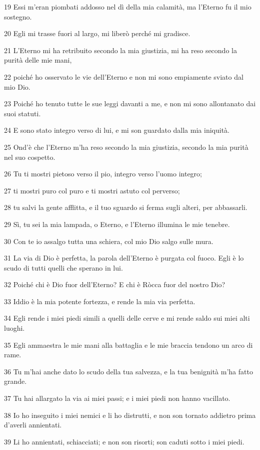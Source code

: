 \par 19 Essi m'eran piombati addosso nel dì della mia calamità, ma l'Eterno fu il mio sostegno.
\par 20 Egli mi trasse fuori al largo, mi liberò perché mi gradisce.
\par 21 L'Eterno mi ha retribuito secondo la mia giustizia, mi ha reso secondo la purità delle mie mani,
\par 22 poiché ho osservato le vie dell'Eterno e non mi sono empiamente sviato dal mio Dio.
\par 23 Poiché ho tenuto tutte le sue leggi davanti a me, e non mi sono allontanato dai suoi statuti.
\par 24 E sono stato integro verso di lui, e mi son guardato dalla mia iniquità.
\par 25 Ond'è che l'Eterno m'ha reso secondo la mia giustizia, secondo la mia purità nel suo cospetto.
\par 26 Tu ti mostri pietoso verso il pio, integro verso l'uomo integro;
\par 27 ti mostri puro col puro e ti mostri astuto col perverso;
\par 28 tu salvi la gente afflitta, e il tuo sguardo si ferma sugli alteri, per abbassarli.
\par 29 Sì, tu sei la mia lampada, o Eterno, e l'Eterno illumina le mie tenebre.
\par 30 Con te io assalgo tutta una schiera, col mio Dio salgo sulle mura.
\par 31 La via di Dio è perfetta, la parola dell'Eterno è purgata col fuoco. Egli è lo scudo di tutti quelli che sperano in lui.
\par 32 Poiché chi è Dio fuor dell'Eterno? E chi è Ròcca fuor del nostro Dio?
\par 33 Iddio è la mia potente fortezza, e rende la mia via perfetta.
\par 34 Egli rende i miei piedi simili a quelli delle cerve e mi rende saldo sui miei alti luoghi.
\par 35 Egli ammaestra le mie mani alla battaglia e le mie braccia tendono un arco di rame.
\par 36 Tu m'hai anche dato lo scudo della tua salvezza, e la tua benignità m'ha fatto grande.
\par 37 Tu hai allargato la via ai miei passi; e i miei piedi non hanno vacillato.
\par 38 Io ho inseguito i miei nemici e li ho distrutti, e non son tornato addietro prima d'averli annientati.
\par 39 Li ho annientati, schiacciati; e non son risorti; son caduti sotto i miei piedi.
